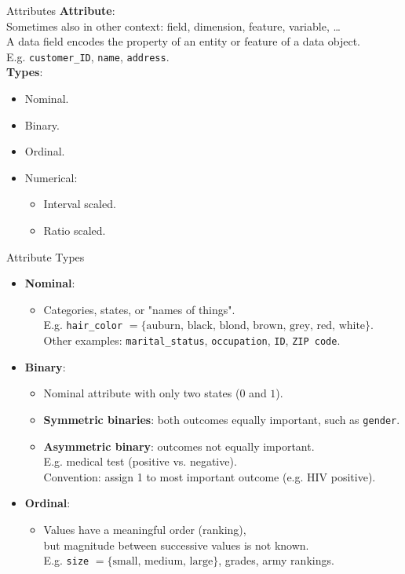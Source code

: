 \begin{frame}{Attributes}
  \textbf{Attribute}:\\
  Sometimes also in other context: field, dimension, feature, variable, \ldots\\[0.2cm]
  A data field encodes the property of an entity or feature of a data object.\\
  E.g. \texttt{customer\_ID}, \texttt{name}, \texttt{address}.\\[0.5cm]

  \textbf{Types}:
  \begin{itemize}
  \item Nominal.
  \item Binary.
  \item Ordinal.
  \item Numerical:
    \begin{itemize}
    \item Interval scaled.
    \item Ratio scaled.
    \end{itemize}
  \end{itemize}
\end{frame}

\begin{frame}{Attribute Types}
  \begin{itemize}
  \item \textbf{Nominal}:
    \begin{itemize}
    \item Categories, states, or "names of things".\\
      E.g. \texttt{hair\_color} $= \{\text{auburn, black, blond, brown, grey, red, white}\}$.\\
      Other examples: \texttt{marital\_status}, \texttt{occupation}, \texttt{ID}, \texttt{ZIP code}.
    \end{itemize}
  \item \textbf{Binary}:
    \begin{itemize}
    \item Nominal attribute with only two states ($0$ and $1$).
    \item \textbf{Symmetric binaries}: both outcomes equally important, such as \texttt{gender}.
    \item \textbf{Asymmetric binary}: outcomes not equally important. \\
      E.g. medical test (positive vs. negative).\\
      Convention: assign 1 to most important outcome (e.g. HIV positive).
    \end{itemize}
  \item \textbf{Ordinal}:
    \begin{itemize}
    \item Values have a meaningful order (ranking),\\
      but magnitude between successive values is not known.\\
      E.g. \texttt{size} $= \{\text{small, medium, large}\}$, grades, army rankings.
    \end{itemize}
  \end{itemize}
\end{frame}

